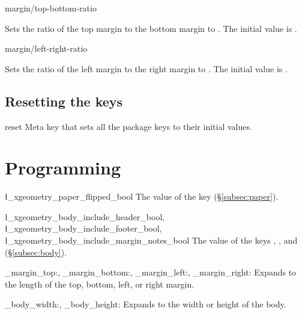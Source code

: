 \documentclass{beerydoc}
\begin{document}
\begin{code}{margin/top-bottom-ratio}
  \begin{syntax}
  \end{syntax}
  Sets the ratio of the top margin to the bottom margin to .
  The initial value is .
\end{code}

\begin{code}{margin/left-right-ratio}
  \begin{syntax}
  \end{syntax}
  Sets the ratio of the left margin to the right margin to .
  The initial value is .
\end{code}

\subsection{Resetting the keys}

\begin{code}{reset}
  Meta key that sets all the  package keys to their initial
  values.
\end{code}

\section{Programming}

\begin{code}{\l_xgeometry_paper_flipped_bool}
  The value of the key  (\S\ref{subsec:paper}).
\end{code}

\begin{code}
  {
    \l_xgeometry_body_include_header_bool,
    \l_xgeometry_body_include_footer_bool,
    \l_xgeometry_body_include_margin_notes_bool
  }
  The value of the keys , ,
  and  (\S\ref{subsec:body}).
\end{code}

\begin{code}
  {
    \xgeometry_margin_top:,
    \xgeometry_margin_bottom:,
    \xgeometry_margin_left:,
    \xgeometry_margin_right:
  }
  Expands to the length of the top, bottom, left, or right margin.
\end{code}

\begin{code}{\xgeometry_body_width:, \xgeometry_body_height:}
  Expands to the width or height of the body.
\end{code}
\end{document}
